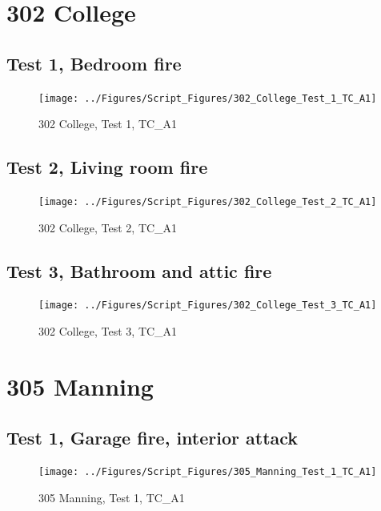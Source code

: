 \documentclass[12pt,oneside]{book}
\begin{document}
\section{302 College}

\subsection{Test 1, Bedroom fire}

\begin{figure}[!ht]
\texttt{[image: ../Figures/Script\_Figures/302\_College\_Test\_1\_TC\_A1]}
\caption{302 College, Test 1, TC\_A1}
\label{fig:302_College_Test_1_TC_A1}
\end{figure}

\subsection{Test 2, Living room fire}

\begin{figure}[!ht]
\texttt{[image: ../Figures/Script\_Figures/302\_College\_Test\_2\_TC\_A1]}
\caption{302 College, Test 2, TC\_A1}
\label{fig:302_College_Test_2_TC_A1}
\end{figure}

\subsection{Test 3, Bathroom and attic fire}

\begin{figure}[!ht]
\texttt{[image: ../Figures/Script\_Figures/302\_College\_Test\_3\_TC\_A1]}
\caption{302 College, Test 3, TC\_A1}
\label{fig:302_College_Test_3_TC_A1}
\end{figure}

\clearpage


\section{305 Manning}

\subsection{Test 1, Garage fire, interior attack}

\begin{figure}[!ht]
\texttt{[image: ../Figures/Script\_Figures/305\_Manning\_Test\_1\_TC\_A1]}
\caption{305 Manning, Test 1, TC\_A1}
\label{fig:305_Manning_Test_1_TC_A1}
\end{figure}
\end{document}
